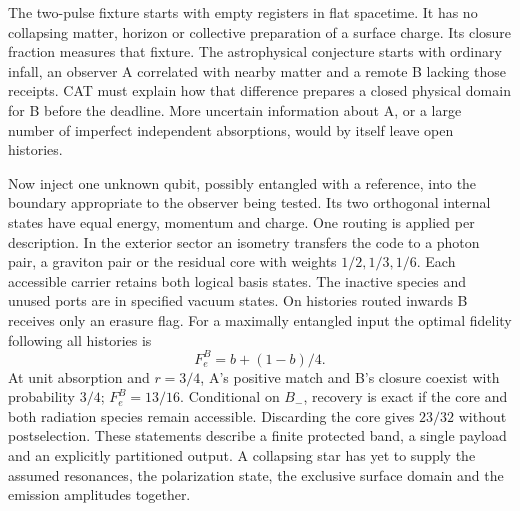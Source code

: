 The two-pulse fixture starts with empty registers in flat spacetime. It has no collapsing matter, horizon or collective preparation of a surface charge. Its closure fraction measures that fixture. The astrophysical conjecture starts with ordinary infall, an observer A correlated with nearby matter and a remote B lacking those receipts. CAT must explain how that difference prepares a closed physical domain for B before the deadline. More uncertain information about A, or a large number of imperfect independent absorptions, would by itself leave open histories.

Now inject one unknown qubit, possibly entangled with a reference, into the boundary appropriate to the observer being tested. Its two orthogonal internal states have equal energy, momentum and charge. One routing is applied per description. In the exterior sector an isometry transfers the code to a photon pair, a graviton pair or the residual core with weights \(1/2,1/3,1/6\). Each accessible carrier retains both logical basis states. The inactive species and unused ports are in specified vacuum states. On histories routed inwards B receives only an erasure flag. For a maximally entangled input the optimal fidelity following all histories is
\[
 F_e^{B}=b+(1-b)/4 .
\]
At unit absorption and \(r=3/4\), A's positive match and B's closure coexist with probability \(3/4\); \(F_e^B=13/16\). Conditional on \(B_-\), recovery is exact if the core and both radiation species remain accessible. Discarding the core gives \(23/32\) without postselection. These statements describe a finite protected band, a single payload and an explicitly partitioned output. A collapsing star has yet to supply the assumed resonances, the polarization state, the exclusive surface domain and the emission amplitudes together.


